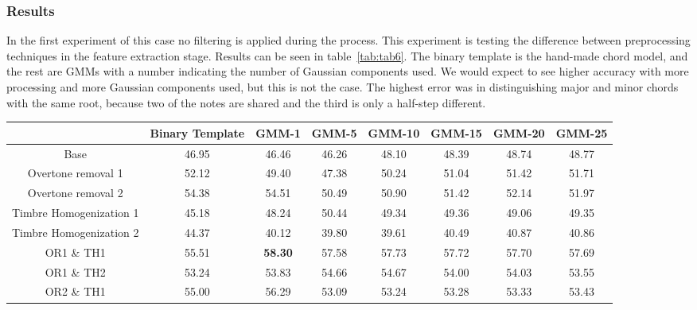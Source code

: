 \documentclass{sig-alternate}
\begin{document}
\subsubsection{Results}

In the first experiment of this case no filtering is applied during the process. This experiment is testing the difference between preprocessing techniques in the feature extraction stage. Results can be seen in table~\ref{tab:tab6}. The binary template is the hand-made chord model, and the rest are GMMs with a number indicating the number of Gaussian components used. We would expect to see higher accuracy with more processing and more Gaussian components used, but this is not the case. The highest error was in distinguishing major and minor chords with the same root, because two of the notes are shared and the third is only a half-step different.


\begin{table*}
\centering
\begin{tabular}{|c|c|c|c|c|c|c|c|} \hline
 & Binary Template & GMM-1 & GMM-5 & GMM-10 & GMM-15 & GMM-20 & GMM-25 \\ \hline
Base & 46.95 & 46.46 & 46.26 & 48.10 & 48.39 & 48.74 & 48.77 \\ \hline
Overtone removal 1 & 52.12 & 49.40 & 47.38 & 50.24 & 51.04 & 51.42 & 51.71 \\ \hline
Overtone removal 2 & 54.38 & 54.51 & 50.49 & 50.90 & 51.42 & 52.14 & 51.97 \\ \hline
Timbre Homogenization 1 & 45.18 & 48.24 & 50.44 & 49.34 & 49.36 & 49.06 & 49.35 \\ \hline
Timbre Homogenization 2 & 44.37 & 40.12 & 39.80 & 39.61 & 40.49 & 40.87 & 40.86 \\ \hline
OR1 \& TH1 & 55.51 & \textbf{58.30} & 57.58 & 57.73 & 57.72 & 57.70 & 57.69 \\ \hline
OR1 \& TH2 & 53.24 & 53.83 & 54.66 & 54.67 & 54.00 & 54.03 & 53.55 \\ \hline
OR2 \& TH1 & 55.00 & 56.29 & 53.09 & 53.24 & 53.28 & 53.33 & 53.43 \\ \hline
\end{tabular}
\caption{Average accuracy without filtering (research case 3, experiment 1).}
\label{tab:tab6}
\end{table*}

\end{document}
